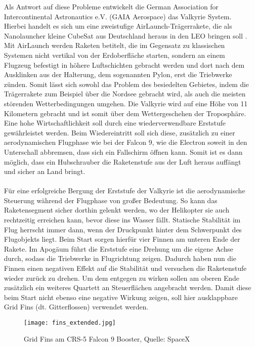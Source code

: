 Als Antwort auf diese Probleme entwickelt die German Association for Intercontinental Astronautics e.V. (GAIA Aerospace) das Valkyrie System. Hierbei handelt es sich um eine zweistufige AirLaunch-Trägerrakete, die als  Nanolauncher kleine CubeSat aus Deutschland heraus in den LEO bringen soll \cite{GAIA}. Mit AirLaunch werden Raketen betitelt, die im Gegensatz zu klassischen Systemen nicht vertikal von der Erdoberfläche starten, sondern an einem Flugzeug befestigt in höhere Luftschichten gebracht werden und dort nach dem Ausklinken aus der Halterung, dem sogenannten Pylon, erst die Triebwerke zünden. Somit lässt sich sowohl das Problem des besiedelten Gebietes, indem die Trägerrakete zum Beispiel über die Nordsee gebracht wird, als auch die meisten störenden Wetterbedingungen umgehen. Die Valkyrie wird auf eine Höhe von 11 Kilometern gebracht \cite{flugbahnBarz} und ist somit über dem Wettergeschehen der Troposphäre. Eine hohe Wirtschaftlichkeit soll durch eine wiederverwendbare Erststufe gewährleistet werden. Beim Wiedereintritt soll sich diese, zusätzlich zu einer aerodynamischen Flugphase wie bei der Falcon 9, wie die Electron soweit in den Unterschall abbremsen, dass sich ein Fallschirm öffnen kann. Somit ist es dann möglich, dass ein Hubschrauber die Raketenstufe aus der Luft heraus auffängt und sicher an Land bringt.
\\~\\
Für eine erfolgreiche Bergung der Erststufe der Valkyrie ist die aerodynamische Steuerung während der Flugphase von großer Bedeutung. So kann das Raketensegment sicher dorthin gelenkt werden, wo der Helikopter sie auch rechtzeitig erreichen kann, bevor diese ins Wasser fällt. Statische Stabilität im Flug herrscht immer dann, wenn der Druckpunkt hinter dem Schwerpunkt des Flugobjekts liegt. Beim Start sorgen hierfür vier Finnen am unteren Ende der Rakete. Im Apogäum führt die Erststufe eine Drehung um die eigene Achse durch, sodass die Triebwerke in Flugrichtung zeigen. Dadurch haben nun die Finnen einen negativen Effekt auf die Stabilität und versuchen die Raketenstufe wieder zurück zu drehen. Um dem entgegen zu wirken sollen am oberen Ende zusätzlich ein weiteres Quartett an Steuerflächen angebracht werden. Damit diese beim Start nicht ebenso eine negative Wirkung zeigen, soll hier ausklappbare Grid Fins (dt. Gitterflossen) verwendet werden.

\begin{figure}[h]
	\centering
	\texttt{[image: fins\_extended.jpg]}
	\caption{Grid Fins am CRS-5 Falcon 9 Booster, Quelle: SpaceX}
\end{figure}

